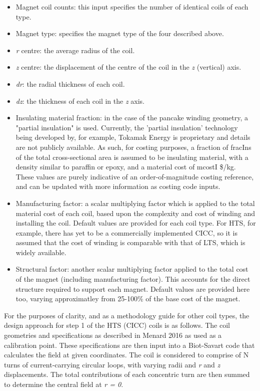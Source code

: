 \begin{itemize}
    \item Magnet coil counts: this input specifies the number of identical coils of each type.
    \item Magnet type: specifies the magnet type of the four described above.
    \item \textit{r} centre: the average radius of the coil.
    \item \textit{z} centre: the displacement of the centre of the coil in the \textit{z} (vertical) axis.
    \item \textit{dr}: the radial thickness of each coil.
    \item \textit{dz}: the thickness of each coil in the \textit{z} axis.
    \item Insulating material fraction: in the case of the pancake winding geometry, a "partial insulation" is used. Currently, the 'partial insulation' technology being developed by, for example, Tokamak Energy is proprietary and details are not publicly available. As such, for costing purposes, a fraction of fracIns of the total cross-sectional area is assumed to be insulating material, with a density similar to paraffin or epoxy, and a material cost of mcostI \$/kg. These values are purely indicative of an order-of-magnitude costing reference, and can be updated with more information as costing code inputs.
    \item Manufacturing factor: a scalar multiplying factor which is applied to the total material cost of each coil, based upon the complexity and cost of winding and installing the coil. Default values are provided for each coil type. For HTS, for example, there has yet to be a commercially implemented CICC, so it is assumed that the cost of winding is comparable with that of LTS, which is widely available. 
    \item Structural factor: another scalar multiplying factor applied to the total cost of the magnet (including manufacturing factor). This accounts for the direct structure required to support each magnet. Default values are provided here too, varying approximatley from 25-100\% of the base cost of the magnet.
\end{itemize}

For the purposes of clarity, and as a methodology guide for other coil types, the design approach for step 1 of the HTS (CICC) coils is as follows. The coil geometries and specifications as described in Menard 2016 \cite{Menard2016} as used as a calibration point. These specifications are then input into a Biot-Savart code that calculates the field at given coordinates. The coil is considered to comprise of N turns of current-carrying circular loops, with varying radii and \textit{r} and \textit{z} displacements. The total contributions of each concentric turn are then summed to determine the central field at \textit{r = 0}.\\

